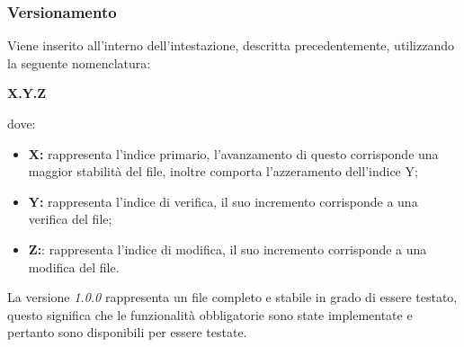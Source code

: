 \subsubsection{Versionamento}
Viene inserito all'interno dell'intestazione, descritta precedentemente, utilizzando la seguente nomenclatura:
\begin{center}
	\textbf{X.Y.Z}
\end{center}
dove:
\begin{itemize}
	\item \textbf{X:} rappresenta l'indice primario, l'avanzamento di questo corrisponde una maggior stabilità del file, inoltre comporta l'azzeramento dell'indice Y;
	\item \textbf{Y:} rappresenta l'indice di verifica, il suo incremento corrisponde a una verifica del file;
	\item \textbf{Z:}: rappresenta l'indice di modifica, il suo incremento corrisponde a una modifica del file.
\end{itemize}
La versione \textit{1.0.0} rappresenta un file completo e stabile in grado di essere testato, questo significa che le funzionalità obbligatorie sono state implementate e pertanto sono disponibili per essere testate.


